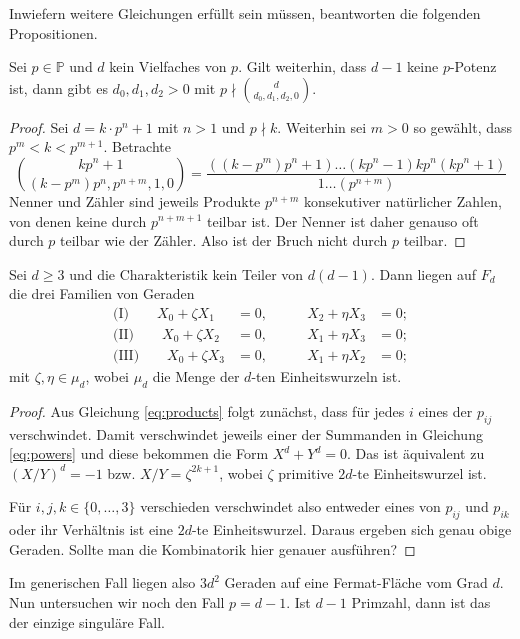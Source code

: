 Inwiefern weitere Gleichungen erfüllt sein müssen, beantworten die folgenden Propositionen.
\begin{prop}
Sei $p \in \mathbb P$ und $d$ kein Vielfaches von $p$. Gilt weiterhin, dass $d-1$ keine $p$-Potenz ist, dann gibt es $d_0, d_1, d_2 > 0$ mit $p \nmid \binom d{d_0,d_1,d_2,0}$.
\end{prop}
\begin{proof}
Sei $d = k \cdot p^n + 1$ mit $n>1$ und $p \nmid k$. Weiterhin sei $m>0$ so gewählt, dass $p^m < k < p^{m+1}$. Betrachte
\begin{equation*}
\binom {kp^n+1}{(k-p^m)p^n,p^{n+m},1,0} = \frac{((k-p^m)p^n+1) \dots (kp^n-1)kp^n(kp^n+1)}{1 \dots (p^{n+m})}
\end{equation*}
Nenner und Zähler sind jeweils Produkte $p^{n+m}$ konsekutiver natürlicher Zahlen, von denen keine durch $p^{n+m+1}$ teilbar ist. Der Nenner ist daher genauso oft durch $p$ teilbar wie der Zähler. Also ist der Bruch nicht durch $p$ teilbar.
\end{proof}

\begin{fact}
Sei $d \geq 3$ und die Charakteristik kein Teiler von $d(d-1)$. Dann liegen auf $F_d$ die drei Familien von Geraden
\begin{align*}
\text{(I)}\qquad	X_0 + \zeta X_1 &= 0, \qquad &X_2 + \eta X_3 &= 0; \\
\text{(II)}\qquad	X_0 + \zeta X_2 &= 0, \qquad &X_1 + \eta X_3 &= 0; \\
\text{(III)}\qquad	X_0 + \zeta X_3 &= 0, \qquad &X_1 + \eta X_2 &= 0;
\end{align*}
mit $\zeta, \eta \in \mu_d$, wobei $\mu_d$ die Menge der $d$-ten Einheitswurzeln ist.
\end{fact}
\begin{proof}
Aus Gleichung \ref{eq:products} folgt zunächst, dass für jedes $i$ eines der $p_{ij}$ verschwindet. Damit verschwindet jeweils einer der Summanden in Gleichung \ref{eq:powers} und diese bekommen die Form $X^d + Y^d = 0$. Das ist äquivalent zu $(X/Y)^d = -1$ bzw. $X/Y = \zeta^{2k+1}$, wobei $\zeta$ primitive $2d$-te Einheitswurzel ist.

Für $i,j,k \in \{0,\dots,3\}$ verschieden verschwindet also entweder eines von $p_{ij}$ und $p_{ik}$ oder ihr Verhältnis ist eine $2d$-te Einheitswurzel. Daraus ergeben sich genau obige Geraden. \note Sollte man die Kombinatorik hier genauer ausführen?
\end{proof}

Im generischen Fall liegen also $3d^2$ Geraden auf eine Fermat-Fläche vom Grad $d$. Nun untersuchen wir noch den Fall $p = d-1$. Ist $d-1$ Primzahl, dann ist das der einzige singuläre Fall.

